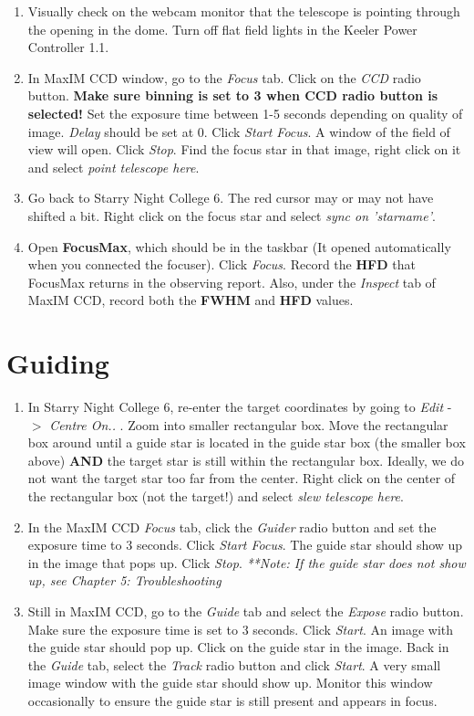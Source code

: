 \documentclass[11pt]{report}
\begin{document}
\begin{enumerate}
\item Visually check on the webcam monitor that the telescope is pointing through the opening in the dome. Turn off flat field lights in the Keeler Power Controller 1.1.
\item In MaxIM CCD window, go to the \emph{Focus} tab. Click on the \emph{CCD} radio button. {\bf Make sure binning is set to 3 when CCD radio button is selected!} Set the exposure time between 1-5 seconds depending on quality of image. \emph{Delay} should be set at 0. Click \emph{Start Focus}. A window of the field of view will open. Click \emph{Stop}. Find the focus star in that image, right click on it and select \emph{point telescope here}.
\item Go back to Starry Night College 6.  The red cursor may or may not have shifted a bit. Right click on the focus star and select \emph{sync on 'starname'}. 
\item Open {\bf FocusMax}, which should be in the taskbar (It opened automatically when you connected the focuser). Click \emph{Focus}. Record the {\bf HFD} that FocusMax returns in the observing report. Also, under the \emph{Inspect} tab of MaxIM CCD, record both the {\bf FWHM} and {\bf HFD} values. 
\end{enumerate}

\section{Guiding}

\begin{enumerate}
\item In Starry Night College 6, re-enter the target coordinates by going to \emph{Edit} -{$>$} \emph{Centre On..} . Zoom into smaller rectangular box. Move the rectangular box around until a guide star is located in the guide star box (the smaller box above)  {\bf AND} the target star is still within the rectangular box. Ideally, we do not want the target star too far from the center. Right click on the center of the rectangular box (not the target!) and select \emph{slew telescope here}.
\item In the MaxIM CCD \emph{Focus} tab, click the \emph{Guider} radio button and set the exposure time to 3 seconds. Click \emph{Start Focus}. The guide star should show up in the image that pops up. Click \emph{Stop}. \emph{**Note: If the guide star does not show up, see Chapter 5: Troubleshooting}
\item Still in MaxIM CCD, go to the \emph{Guide} tab and select the \emph{Expose} radio button. Make sure the exposure time is set to 3 seconds. Click \emph{Start}. An image with the guide star should pop up. Click on the guide star in the image. Back in the \emph{Guide} tab, select the \emph{Track} radio button and click \emph{Start}. A very small image window with the guide star should show up. Monitor this window occasionally to ensure the guide star is still present and appears in focus. 
\end{enumerate}
\end{document}
